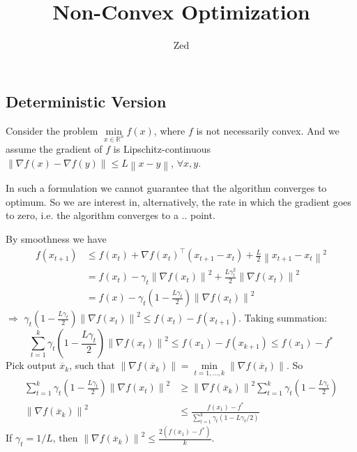 \documentclass[a4paper, 11pt]{article}
\title{Non-Convex Optimization}
\author{Zed}
\begin{document}
\maketitle

\subsection{Deterministic Version}
Consider the problem $\min\limits_{x\in \mathbb{R}^n} f(x)$,  where $f$ is not necessarily convex. And we assume the gradient of $f$ is Lipschitz-continuous $\left\|\nabla f(x)- \nabla f(y)\right\| \leq L \left\|x - y\right\|$, $\forall x,y$.

In such a formulation we cannot guarantee that the algorithm converges to optimum. So we are interest in, alternatively, the rate in which the gradient goes to zero, i.e. the algorithm converges to a .. point.

By smoothness we have
\begin{equation}
  \begin{split}
      f(x_{t+1}) &\leq f(x_t) +  \nabla f(x_t)^{\top} (x_{t+1}-x_t) + \frac{L}{2}\left\|x_{t+1}-x_t\right\|^2 \\
      &=f(x_t) - \gamma_t \left\|\nabla f(x_t)\right\|^2 + \frac{L \gamma^2_t}{2} \left\|\nabla f(x_t)\right\|^2 \\
      &= f(x) - \gamma_t\left(1-\frac{L \gamma_t}{2}\right) \left\|\nabla f(x_t)\right\|^2
  \end{split}
\end{equation}
$\Rightarrow$ $\gamma_t (1-\frac{L \gamma_t}{2}) \left\|\nabla f(x_t)\right\|^2 \leq f(x_t) - f(x_{t+1})$. Taking summation:
\begin{equation}
  \sum_{t=1}^k \gamma_t (1-\frac{L \gamma_t}{2}) \left\|\nabla f(x_t)\right\|^2 \leq f(x_1) - f(x_{k+1}) \leq f(x_1) - f^*
\end{equation}
Pick output $\overline{x}_k$, such that $\left\|\nabla f(\overline{x}_k)\right\|= \min\limits_{t=1,...,k} \left\|\nabla f(\overline{x}_t)\right\|$. So
\begin{equation}
  \begin{split}
      \sum_{t=1}^k \gamma_t \left(1-\frac{L \gamma_t}{2}\right) \left\|\nabla f(x_t)\right\|^2 &\geq  \left\|\nabla f(\overline{x}_k)\right\|^2\sum_{t=1}^k \gamma_t \left(1-\frac{L \gamma_t}{2}\right)  \\
      \left\|\nabla f(\overline{x}_k)\right\|^2 &\leq \frac{f(x_1)-f^*}{\sum_{t=1}^k \gamma_t(1-L \gamma_t/2)}
  \end{split}
\end{equation}
If $\gamma_t = 1/L$, then $\left\|\nabla f(\overline{x}_k)\right\|^2 \leq \frac{2(f(x_1) - f^*)}{k}$. 
\end{document}
